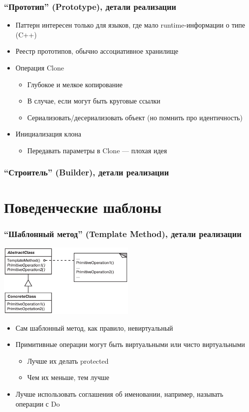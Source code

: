 \documentclass[xetex,mathserif,serif]{beamer}
\begin{document}
	\begin{frame}
		\frametitle{``Прототип'' (Prototype), детали реализации}
		\begin{itemize}
			\item Паттерн интересен только для языков, где мало runtime-информации о типе (C++)
			\item Реестр прототипов, обычно ассоциативное хранилище
			\item Операция Clone
			\begin{itemize}
				\item Глубокое и мелкое копирование
				\item В случае, если могут быть круговые ссылки
				\item Сериализовать/десериализовать объект (но помнить про идентичность)
			\end{itemize}
			\item Инициализация клона
			\begin{itemize}
				\item Передавать параметры в Clone --- плохая идея
			\end{itemize}
		\end{itemize}
	\end{frame}

	\begin{frame}
		\frametitle{``Строитель'' (Builder), детали реализации}
	\end{frame}

	\section{Поведенческие шаблоны}

	\begin{frame}
		\frametitle{``Шаблонный метод'' (Template Method), детали реализации}
		\begin{center}
			\includegraphics[width=0.5\textwidth]{templateMethod.png}
		\end{center}
		\begin{itemize}
			\item Сам шаблонный метод, как правило, невиртуальный
			\item Примитивные операции могут быть виртуальными или чисто виртуальными
			\begin{itemize}
				\item Лучше их делать protected
				\item Чем их меньше, тем лучше
			\end{itemize}
			\item Лучше использовать соглашения об именовании, например, называть операции с Do
		\end{itemize}
	\end{frame}
\end{document}
